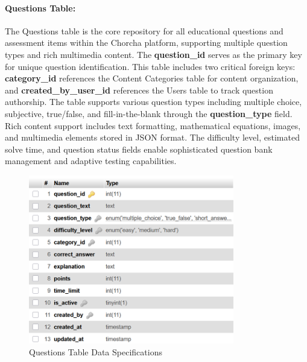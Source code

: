 \documentclass[12pt,a4paper,oneside]{book}
\begin{document}
\paragraph{Questions Table:}
The Questions table is the core repository for all educational questions and assessment items within the Chorcha platform, supporting multiple question types and rich multimedia content. The \textbf{question\_id} serves as the primary key for unique question identification. This table includes two critical foreign keys: \textbf{category\_id} references the Content Categories table for content organization, and \textbf{created\_by\_user\_id} references the Users table to track question authorship. The table supports various question types including multiple choice, subjective, true/false, and fill-in-the-blank through the \textbf{question\_type} field. Rich content support includes text formatting, mathematical equations, images, and multimedia elements stored in JSON format. The difficulty level, estimated solve time, and question status fields enable sophisticated question bank management and adaptive testing capabilities.

\begin{figure}[H]
\centering
\includegraphics[width=0.8\textwidth]{assets/DBTable/Table4.5.png}
\caption{Questions Table Data Specifications}
\label{table:questions}
\end{figure}

\clearpage
\end{document}

